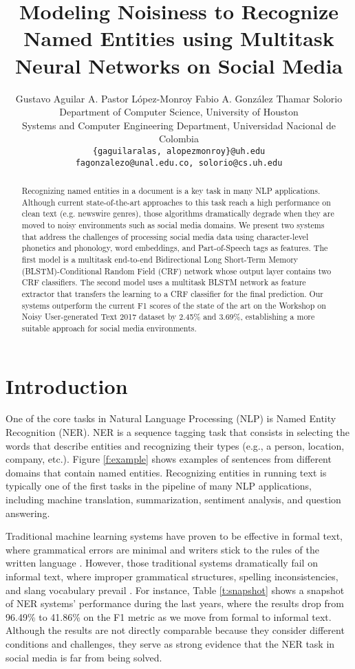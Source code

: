 \documentclass[11pt,a4paper]{article}
\title{Modeling Noisiness to Recognize Named Entities using Multitask Neural Networks on Social Media}
\author{Gustavo Aguilar A. Pastor L\'{o}pez-Monroy  Fabio A. González Thamar Solorio \\
Department of Computer Science, University of Houston\\
Systems and Computer Engineering Department, Universidad Nacional de Colombia\\
{\tt \{gaguilaralas, alopezmonroy\}@uh.edu} \\
{\tt fagonzalezo@unal.edu.co, solorio@cs.uh.edu}
}
\date{}
\begin{document}
\maketitle

\begin{abstract}
Recognizing named entities in a document is a key task in many NLP applications. Although current state-of-the-art approaches to this task reach a high performance on clean text (e.g. newswire genres), those algorithms dramatically degrade when they are moved to noisy environments such as social media domains. We present two systems that address the challenges of processing social media data using character-level phonetics and phonology, word embeddings, and Part-of-Speech tags as features. The first model is a multitask end-to-end Bidirectional Long Short-Term Memory (BLSTM)-Conditional Random Field (CRF) network whose output layer contains two CRF classifiers. The second model uses a multitask BLSTM network as feature extractor that transfers the learning to a CRF classifier for the final prediction. Our systems outperform the current F1 scores of the state of the art on the Workshop on Noisy User-generated Text 2017 dataset by 2.45\% and 3.69\%, establishing a more suitable approach for social media environments. 
\end{abstract}


\section{Introduction}

One of the core tasks in Natural Language Processing (NLP) is Named Entity Recognition (NER). NER is a sequence tagging task that consists in selecting the words that describe entities and recognizing their types (e.g., a person, location, company, etc.).
Figure \ref{f:example} shows examples of sentences from different domains that contain named entities. Recognizing entities in running text is typically one of the first tasks in the pipeline of many NLP applications, including machine translation, summarization, sentiment analysis, and question answering. 

Traditional machine learning systems have proven to be effective in formal text, where grammatical errors are minimal and writers stick to the rules of the written language \citep{Florian:2003:NER, Chieu:2003:NER}. However, those traditional systems dramatically fail on informal text, where improper grammatical structures, spelling inconsistencies, and slang vocabulary prevail \citep{Ritter:2011:NER:2145432.2145595}. For instance, Table \ref{t:snapshot} shows a snapshot of NER systems' performance during the last years, where the results drop from 96.49\% to 41.86\% on the F1 metric as we move from formal to informal text. Although the results are not directly comparable because they consider different conditions and challenges, they serve as strong evidence that the NER task in social media is far from being solved.
\end{document}
